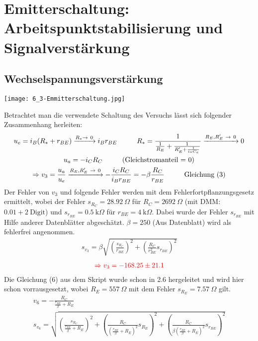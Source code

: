
\newpage
\section{Emitterschaltung: Arbeitspunktstabilisierung und Signalverstärkung}
\subsection{Wechselspannungsverstärkung}
\begin{center}
    \texttt{[image: 6\_3-Emmitterschaltung.jpg]}
\end{center}
Betrachtet man die verwendete Schaltung des Versuchs lässt sich folgender Zusammenhang herleiten:
\begin{gather}
    u_e = i_B(R_*+r_{BE})\xrightarrow{R_*\rightarrow~0} i_B r_{BE} \tab R_*=\frac{1}{\frac{1}{R_E}+\frac{1}{R_E' +\frac{1}{i\omega C_e}}} \xrightarrow{R_E,R_E'~\rightarrow~0} 0\\
    u_a = -i_CR_C\tab\text{(Gleichstromanteil = 0)}\\
    \Rightarrow v_3 =\frac{u_a}{u_e}\xrightarrow{R_E,R_E'~\rightarrow~0}-\frac{i_C R_C}{i_B r_{BE}}=-\beta\frac{R_C}{r_{BE}} \tab\text{Gleichung (3)}
\end{gather}
Der Fehler von $v_3$ und folgende Fehler werden mit dem Fehlerfortpflanzungsgesetz ermittelt, wobei der Fehler $s_{R_C}= 28.92~\Omega$ für $R_C=2692~\Omega$ (mit DMM: $0.01 + 2~\text{Digit}$) und $s_{r_{BE}}=0.5~\text{k}\Omega$ für $r_{BE}=4~\text{k}\Omega$. Dabei wurde der Fehler $s_{r_{BE}}$ mit Hilfe anderer Datenblätter abgeschätzt. $\beta = 250$ (Aus Datenblatt) wird als fehlerfrei angenommen.
\begin{gather}
    s_{v_3} = \beta\sqrt{\left(\frac{s_{R_C}}{r_{BE}}\right)^2+\left(\frac{R_C}{r_{BE}^2}s_{r_{BE}}\right)^2}
\end{gather}
\begin{gather*}
    \textcolor{red}{\Rightarrow v_3 = -168.25 \pm 21.1}
\end{gather*}
Die Gleichung (6) aus dem Skript wurde schon in 2.6 hergeleitet und wird hier schon vorrausgesetzt, wobei $R_E=557~\Omega$ mit dem Fehler $s_{R_E}=7.57~\Omega$ gilt.
\begin{gather}
    v_6 =-\frac{R_C}{\frac{r_{BE}}{\beta}+R_E} \\
    s_{v_6} = \sqrt{\left(\frac{s_{R_C}}{\frac{r_{BE}}{\beta}+R_E}\right)^2+ \left(\frac{R_C}{(\frac{r_{BE}}{\beta}+R_E)^2}s_{R_E}\right)^2 + \left(\frac{R_C}{\beta(\frac{r_{BE}}{\beta}+R_E)^2}s_{r_{BE}}\right)^2}
\end{gather}
